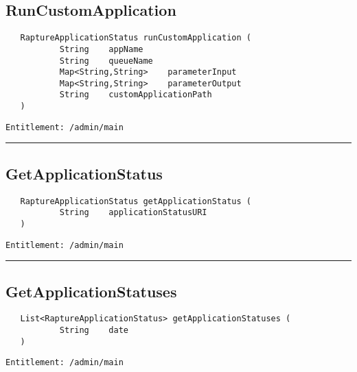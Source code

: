 \subsection{RunCustomApplication}
\label{Api:RunCustomApplication}
\begin{verbatim}
   RaptureApplicationStatus runCustomApplication (
           String    appName
           String    queueName
           Map<String,String>    parameterInput
           Map<String,String>    parameterOutput
           String    customApplicationPath
   )
\end{verbatim}
\begin{Verbatim}[fontsize=\small, formatcom=\color{Maroon}]
  Entitlement: /admin/main
\end{Verbatim}



\rule{12cm}{2pt}
\subsection{GetApplicationStatus}
\label{Api:GetApplicationStatus}
\begin{verbatim}
   RaptureApplicationStatus getApplicationStatus (
           String    applicationStatusURI
   )
\end{verbatim}
\begin{Verbatim}[fontsize=\small, formatcom=\color{Maroon}]
  Entitlement: /admin/main
\end{Verbatim}



\rule{12cm}{2pt}
\subsection{GetApplicationStatuses}
\label{Api:GetApplicationStatuses}
\begin{verbatim}
   List<RaptureApplicationStatus> getApplicationStatuses (
           String    date
   )
\end{verbatim}
\begin{Verbatim}[fontsize=\small, formatcom=\color{Maroon}]
  Entitlement: /admin/main
\end{Verbatim}



